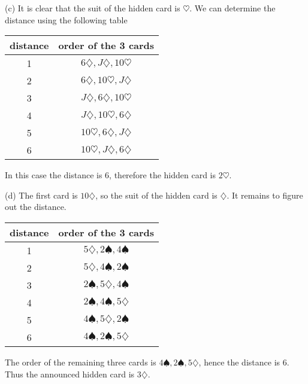 \begin{enumerate}
(c) It is clear that the suit of the hidden card is $\heartsuit$. We can determine the distance using the following table
\begin{center}
\begin{tabular}{|c|c|}
\hline
distance & order of the 3 cards\\
\hline
1 & $6\diamondsuit,J\diamondsuit,10\heartsuit$\\
\hline
2 & $6\diamondsuit,10\heartsuit,J\diamondsuit$\\
\hline
3 & $J\diamondsuit,6\diamondsuit,10\heartsuit$\\
\hline
4 & $J\diamondsuit,10\heartsuit,6\diamondsuit$\\
\hline
5 & $10\heartsuit,6\diamondsuit,J\diamondsuit$\\
\hline
6 & $10\heartsuit,J\diamondsuit,6\diamondsuit$\\
\hline
\end{tabular}
\end{center}
In this case the distance is 6, therefore the hidden card is $2\heartsuit$.

(d) The first card is $10\diamondsuit$, so the suit of the hidden card is $\diamondsuit$. It remains to figure out the distance.
\begin{center}
\begin{tabular}{|c|c|}
\hline
distance & order of the 3 cards\\
\hline
1 & $5\diamondsuit,2\spadesuit,4\spadesuit$\\
\hline
2 & $5\diamondsuit,4\spadesuit,2\spadesuit$\\
\hline
3 & $2\spadesuit,5\diamondsuit,4\spadesuit$\\
\hline
4 & $2\spadesuit,4\spadesuit,5\diamondsuit$\\
\hline
5 & $4\spadesuit,5\diamondsuit,2\spadesuit$\\
\hline
6 & $4\spadesuit,2\spadesuit,5\diamondsuit$\\
\hline
\end{tabular}
\end{center}
The order of the remaining three cards is $4\spadesuit,2\spadesuit,5\diamondsuit$, hence the distance is 6.
Thus the announced hidden card is $3\diamondsuit$.


\end{enumerate}
